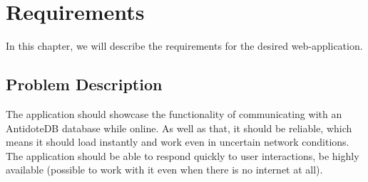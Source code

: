 \chapter{Requirements}
\label{Requirements}

In this chapter, we will describe the requirements for the desired web-application. 

\section{Problem Description}

The application should showcase the functionality of communicating with an AntidoteDB database while online. As well as that, it should be reliable, which means it should load instantly and work even in uncertain network conditions. The application should be able to respond quickly to user interactions, be highly available (possible to work with it even when there is no internet at all).